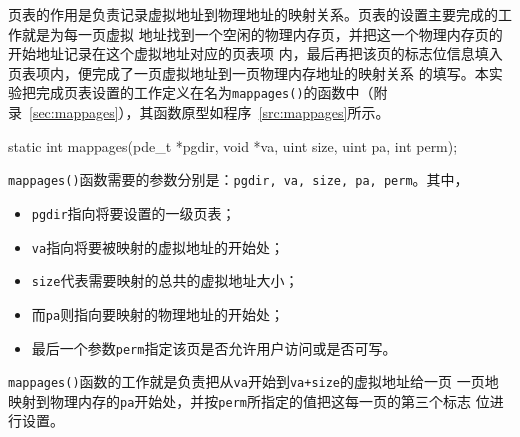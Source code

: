 \documentclass{swfuthesism}
\begin{document}
页表的作用是负责记录虚拟地址到物理地址的映射关系。页表的设置主要完成的工作就是为每一页虚拟
地址找到一个空闲的物理内存页，并把这一个物理内存页的开始地址记录在这个虚拟地址对应的页表项
内，最后再把该页的标志位信息填入页表项内，便完成了一页虚拟地址到一页物理内存地址的映射关系
的填写。本实验把完成页表设置的工作定义在名为\texttt{mappages()}的函数中（附
录~\ref{sec:mappages}），其函数原型如程序~\ref{src:mappages}所示。

\begin{listing}%
  \begin{codeblock}
\begin{ccode}
static int
mappages(pde_t *pgdir, void *va, uint size, uint pa, int perm);
\end{ccode}
  \end{codeblock}
  \label{src:mappages}
\end{listing}

\texttt{mappages()}函数需要的参数分别是：\texttt{pgdir, va,
  size, pa, perm}。其中，
\begin{itemize}
\item \texttt{pgdir}指向将要设置的一级页表；
\item \texttt{va}指向将要被映射的虚拟地址的开始处；
\item \texttt{size}代表需要映射的总共的虚拟地址大小；
\item 而\texttt{pa}则指向要映射的物理地址的开始处；
\item 最后一个参数\texttt{perm}指定该页是否允许用户访问或是否可写。
\end{itemize}

\texttt{mappages()}函数的工作就是负责把从\texttt{va}开始到\texttt{va+size}的虚拟地址给一页
一页地映射到物理内存的\texttt{pa}开始处，并按\texttt{perm}所指定的值把这每一页的第三个标志
位进行设置。
\end{document}
